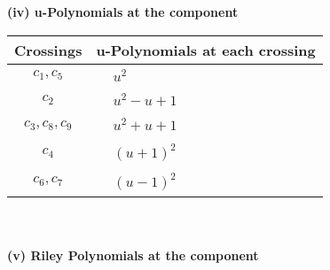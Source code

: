 \documentclass[1p]{elsarticle_modified}
\theoremstyle{definition}
\begin{document}
\newpage\renewcommand{\arraystretch}{1}
\flushleft \textbf{(iv) u-Polynomials at the component}\newline \\
\begin{tabular}{m{50pt}|m{274pt}}
Crossings & \hspace{64pt}u-Polynomials at each crossing \\
\hline $$\begin{aligned}c_{1},c_{5}\end{aligned}$$&$\begin{aligned}
&u^2
\end{aligned}$\\
\hline $$\begin{aligned}c_{2}\end{aligned}$$&$\begin{aligned}
&u^2- u+1
\end{aligned}$\\
\hline $$\begin{aligned}c_{3},c_{8},c_{9}\end{aligned}$$&$\begin{aligned}
&u^2+u+1
\end{aligned}$\\
\hline $$\begin{aligned}c_{4}\end{aligned}$$&$\begin{aligned}
&(u+1)^2
\end{aligned}$\\
\hline $$\begin{aligned}c_{6},c_{7}\end{aligned}$$&$\begin{aligned}
&(u-1)^2
\end{aligned}$\\
\hline
\end{tabular}\\~\\
\newpage\renewcommand{\arraystretch}{1}
\flushleft \textbf{(v) Riley Polynomials at the component}\newline \\
\end{document}
